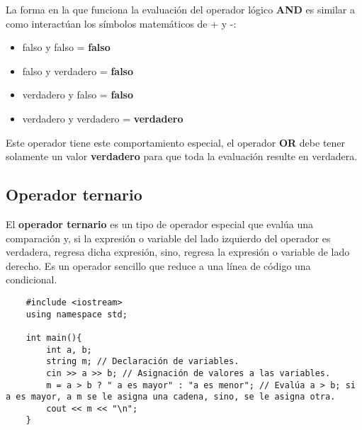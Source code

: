 La forma en la que funciona la evaluación del operador lógico \textbf{AND} es similar a como interactúan los símbolos matemáticos de + y -:
\begin{itemize}
    \item falso y falso = \textbf{falso}
    \item falso y verdadero = \textbf{falso}
    \item verdadero y falso = \textbf{falso}
    \item verdadero y verdadero = \textbf{verdadero}
\end{itemize}

Este operador tiene este comportamiento especial, el operador \textbf{OR} debe tener solamente un valor \textbf{verdadero} para que toda la evaluación resulte en verdadera.


\subsection{Operador ternario}

El \textbf{operador ternario} es un tipo de operador especial que evalúa una comparación y, si la expresión o variable del lado izquierdo del operador es verdadera, regresa dicha expresión, sino, regresa la expresión o variable de lado derecho. Es un operador sencillo que reduce a una línea de código una condicional.
\begin{lstlisting}
    #include <iostream>
    using namespace std;
    
    int main(){
        int a, b;
        string m; // Declaración de variables.
        cin >> a >> b; // Asignación de valores a las variables.
        m = a > b ? " a es mayor" : "a es menor"; // Evalúa a > b; si a es mayor, a m se le asigna una cadena, sino, se le asigna otra.
        cout << m << "\n";
    }
\end{lstlisting}